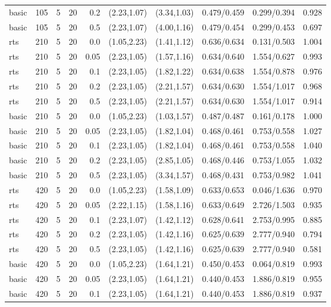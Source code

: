 \begin{tabular}{llrrrccccc}
basic & 105 & 5 & 20 & 0.2 & (2.23,1.07) & (3.34,1.03) & 0.479/0.459 & 0.299/0.394 & 0.928 \\
basic & 105 & 5 & 20 & 0.5 & (2.23,1.07) & (4.00,1.16) & 0.479/0.454 & 0.299/0.453 & 0.697 \\
rts & 210 & 5 & 20 & 0.0 & (1.05,2.23) & (1.41,1.12) & 0.636/0.634 & 0.131/0.503 & 1.004 \\
rts & 210 & 5 & 20 & 0.05 & (2.23,1.05) & (1.57,1.16) & 0.634/0.640 & 1.554/0.627 & 0.993 \\
rts & 210 & 5 & 20 & 0.1 & (2.23,1.05) & (1.82,1.22) & 0.634/0.638 & 1.554/0.878 & 0.976 \\
rts & 210 & 5 & 20 & 0.2 & (2.23,1.05) & (2.21,1.57) & 0.634/0.630 & 1.554/1.017 & 0.968 \\
rts & 210 & 5 & 20 & 0.5 & (2.23,1.05) & (2.21,1.57) & 0.634/0.630 & 1.554/1.017 & 0.914 \\
basic & 210 & 5 & 20 & 0.0 & (1.05,2.23) & (1.03,1.57) & 0.487/0.487 & 0.161/0.178 & 1.000 \\
basic & 210 & 5 & 20 & 0.05 & (2.23,1.05) & (1.82,1.04) & 0.468/0.461 & 0.753/0.558 & 1.027 \\
basic & 210 & 5 & 20 & 0.1 & (2.23,1.05) & (1.82,1.04) & 0.468/0.461 & 0.753/0.558 & 1.040 \\
basic & 210 & 5 & 20 & 0.2 & (2.23,1.05) & (2.85,1.05) & 0.468/0.446 & 0.753/1.055 & 1.032 \\
basic & 210 & 5 & 20 & 0.5 & (2.23,1.05) & (3.34,1.57) & 0.468/0.431 & 0.753/0.982 & 1.041 \\
rts & 420 & 5 & 20 & 0.0 & (1.05,2.23) & (1.58,1.09) & 0.633/0.653 & 0.046/1.636 & 0.970 \\
rts & 420 & 5 & 20 & 0.05 & (2.22,1.15) & (1.58,1.16) & 0.633/0.649 & 2.726/1.503 & 0.935 \\
rts & 420 & 5 & 20 & 0.1 & (2.23,1.07) & (1.42,1.12) & 0.628/0.641 & 2.753/0.995 & 0.885 \\
rts & 420 & 5 & 20 & 0.2 & (2.23,1.05) & (1.42,1.16) & 0.625/0.639 & 2.777/0.940 & 0.794 \\
rts & 420 & 5 & 20 & 0.5 & (2.23,1.05) & (1.42,1.16) & 0.625/0.639 & 2.777/0.940 & 0.581 \\
basic & 420 & 5 & 20 & 0.0 & (1.05,2.23) & (1.64,1.21) & 0.450/0.453 & 0.064/0.819 & 0.993 \\
basic & 420 & 5 & 20 & 0.05 & (2.23,1.05) & (1.64,1.21) & 0.440/0.453 & 1.886/0.819 & 0.955 \\
basic & 420 & 5 & 20 & 0.1 & (2.23,1.05) & (1.64,1.21) & 0.440/0.453 & 1.886/0.819 & 0.937 \\

\end{tabular}
